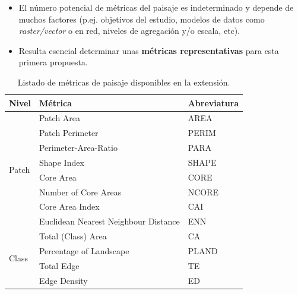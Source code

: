 \begin{graybox}
\begin{itemize}
\item El número potencial de métricas del paisaje es indeterminado y depende de muchos factores (p.ej. objetivos del estudio, modelos de datos como \textit{raster/vector} o en red, niveles de agregación y/o escala, etc).
\item Resulta esencial determinar unas \textbf{métricas representativas} para esta primera propuesta.
\end{itemize}
\end{graybox}


\begin{table}[]
\centering
\caption{Listado de métricas de paisaje disponibles en la extensión.}
\label{my-label}
\begin{tabular}{lll}
\hline
\textbf{Nivel}             & \textbf{Métrica}                     & \textbf{Abreviatura} \\ \hline
\multirow{8}{*}{Patch}     & Patch Area                           & AREA                 \\
                           & Patch Perimeter                      & PERIM                \\
                           & Perimeter-Area-Ratio                 & PARA                 \\
                           & Shape Index                          & SHAPE                \\
                           & Core Area                            & CORE                 \\
                           & Number of Core Areas                 & NCORE                \\
                           & Core Area Index                      & CAI                  \\
                           & Euclidean Nearest Neighbour Distance & ENN                  \\ \hline
\multirow{8}{*}{Class}     & Total (Class) Area                   & CA                   \\
                           & Percentage of Landscape              & PLAND                \\
                           & Total Edge                           & TE                   \\
                           & Edge Density                         & ED                   \\

\end{tabular}
\end{table}
